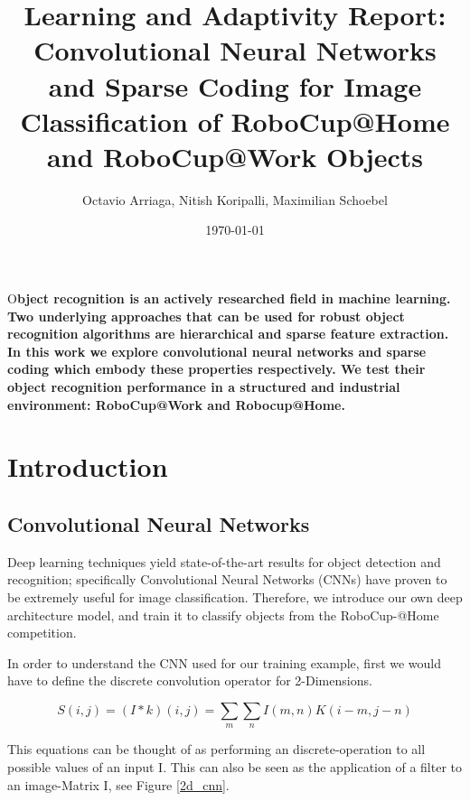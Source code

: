 \documentclass[	DIV=calc,%
				paper=a4,%
				fontsize=11pt,%
				twocolumn]{scrartcl}	 %
\title{Learning and Adaptivity Report:
\\Convolutional Neural Networks and Sparse Coding for Image Classification of RoboCup@Home and RoboCup@Work Objects}%
\author{Octavio Arriaga, Nitish Koripalli, Maximilian Schoebel   }	%
\date{\today}
\newcommand{\initial}[1]{%
     \lettrine[lines=3,lhang=0.3,nindent=0em]{
     				\color{brsublue}
     				{\textsf{#1}}}{}}
\begin{document}
\maketitle
\thispagestyle{fancy} %
\initial{O}\textbf{bject recognition is an actively researched field in machine learning. Two underlying approaches that can be used for robust object recognition algorithms are hierarchical and sparse feature extraction. In this work we explore convolutional neural networks and sparse coding which embody these properties respectively. We test their object recognition performance in a structured and industrial environment: RoboCup@Work and Robocup@Home.}

\section{Introduction}

\subsection*{Convolutional Neural Networks}

Deep learning techniques yield state-of-the-art results for object detection and recognition; specifically Convolutional Neural Networks (CNNs) have proven to be extremely useful for image classification. Therefore, we introduce our own deep architecture model, and train it to classify objects from the RoboCup-@Home competition.

In order to understand the CNN used for our training example, first we would have to define the discrete convolution operator for 2-Dimensions. 

\begin{equation}
S(i,j) = (I * k)(i,j) = \sum_m \sum_n I(m,n)K(i-m,j-n)
\end{equation}

This equations can be thought of as performing an discrete-operation to all possible values of an input I. This can also be seen as the application of a filter to an image-Matrix I, see Figure \ref{2d_cnn}.
\end{document}
